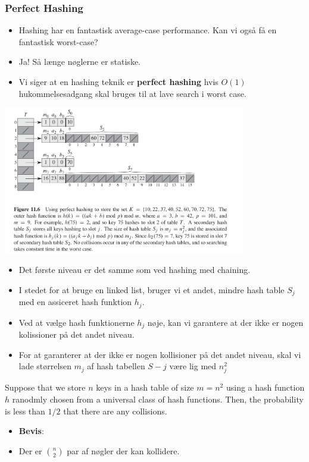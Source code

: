 \documentclass{beamer}
\begin{document}
\begin{frame}[allowframebreaks]
  \frametitle{Perfect Hashing}
  \begin{itemize}
    \item Hashing har en fantastisk average-case performance. Kan vi også få en fantastisk worst-case? 
    \item Ja! Så længe nøglerne er statiske.
    \item Vi siger at en hashing teknik er \textbf{perfect hashing} hvis $O(1)$ hukommelsesadgang skal bruges til at lave search i worst case.
  \end{itemize}
  \includegraphics[width=300pt]{main--hashing-bb76.png}
  \begin{itemize}
  \item Det første niveau er det samme som ved hashing med chaining. 
  \item I stedet for at bruge en linked list, bruger vi et andet, mindre hash table $S_j$ med en assiceret hash funktion $h_{j}$. 
  \item Ved at vælge hash funktionerne $h_{j}$ nøje, kan vi garantere at der ikke er nogen kolissioner på det andet niveau.
  \item For at garanterer at der ikke er nogen kollisioner på det andet niveau, skal vi lade størrelsen $m_{j}$ af hash tabellen $S-j$ være lig med $n_{j}^{2}$
  \end{itemize}
  \begin{theorem}[11.9]
Suppose that we store $n$ keys in a hash table of size $m = n^{2}$ using a hash function $h$ ranodmly chosen from a universal class of hash functions. Then, the probability is less than $1/2$ that there are any collisions. 
  \end{theorem}
  \begin{itemize}
  \item \textbf{Bevis}:
  \item Der er $\binom{n}{2}$ par af nøgler der kan kollidere. 

\end{itemize}
\end{frame}
\end{document}
